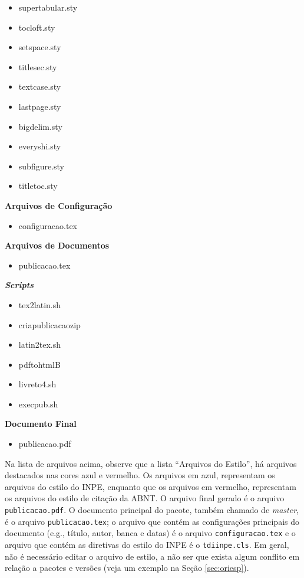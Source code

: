 \begin{multicols}{2}
\begin{itemize}
		\item supertabular.sty
		\item tocloft.sty   
        \item setspace.sty
		\item titlesec.sty   
        \item textcase.sty
		\item lastpage.sty     
        \item bigdelim.sty
		\item everyshi.sty 
        \item subfigure.sty
		\item titletoc.sty
	\end{itemize}
	\textbf{Arquivos de Configuração}
	\begin{itemize}
		\item configuracao.tex
	\end{itemize}
    \textbf{Arquivos de Documentos}
    \begin{itemize}
        \item publicacao.tex
    \end{itemize}
    \textbf{\textit{Scripts}}
    \begin{itemize}
        \item tex2latin.sh
        \item criapublicacaozip
        \item latin2tex.sh
        \item pdftohtmlB
        \item livreto4.sh
        \item execpub.sh
    \end{itemize}
    \textbf{Documento Final}
    \begin{itemize}
        \item publicacao.pdf
    \end{itemize}
\end{multicols}

Na lista de arquivos acima, observe que a lista ``Arquivos do Estilo'', há arquivos destacados nas cores azul e vermelho. Os arquivos em azul, representam os arquivos do estilo do INPE, enquanto que os arquivos em vermelho, representam os arquivos do estilo de citação da ABNT. O arquivo final gerado é o arquivo {\tt publicacao.pdf}. O documento principal do pacote, também chamado de \textit{master}, é o arquivo {\tt publicacao.tex}; o arquivo que contém as configurações principais do documento (e.g., título, autor, banca e datas) é o arquivo {\tt configuracao.tex} e o arquivo que contém as diretivas do estilo do INPE é o {\tt tdiinpe.cls}. Em geral, não é necessário editar o arquivo de estilo, a não ser que exista algum conflito em relação a pacotes e versões (veja um exemplo na Seção \ref{sec:oriesp}). 

